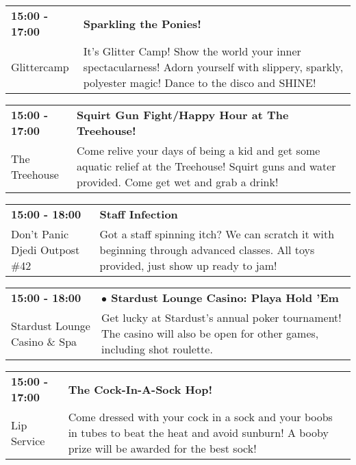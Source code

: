 \begin{tabular}{ p{1in} p{2.2in} }
    \textbf{15:00 - 17:00} & \textbf{Sparkling the Ponies!} \\
    Glittercamp \newline  & It's Glitter Camp! Show the world your inner spectacularness!  Adorn yourself with slippery, sparkly, polyester magic!  Dance to the disco and SHINE! \\
    \hline 
\end{tabular}
    
\begin{tabular}{ p{1in} p{2.2in} }
    \textbf{15:00 - 17:00} & \textbf{Squirt Gun Fight/Happy Hour at The Treehouse!} \\
    The Treehouse \newline  & Come relive your days of being a kid and get some aquatic relief at the Treehouse! Squirt guns and water provided. Come get wet and grab a drink! \\
    \hline 
\end{tabular}
    
\begin{tabular}{ p{1in} p{2.2in} }
    \textbf{15:00 - 18:00} & \textbf{Staff Infection} \\
    Don't Panic Djedi Outpost \#42 \newline  & Got a staff spinning itch? We can scratch it with beginning through advanced classes. All toys provided, just show up ready to jam! \\
    \hline 
\end{tabular}
    
\begin{tabular}{ p{1in} p{2.2in} }
    \textbf{15:00 - 18:00} & \textbf{$\bullet$	Stardust Lounge Casino: Playa Hold 'Em} \\
    Stardust Lounge Casino \& Spa \newline  & Get lucky at Stardust's annual poker tournament! The casino will also be open for other games, including shot roulette. \\
    \hline 
\end{tabular}
    
\begin{tabular}{ p{1in} p{2.2in} }
    \textbf{15:00 - 17:00} & \textbf{The Cock-In-A-Sock Hop!} \\
    Lip Service \newline  & Come dressed with your cock in a sock and your boobs in tubes to beat the heat and avoid sunburn! A booby prize will be awarded for the best sock! \\
    \hline 
\end{tabular}
    
